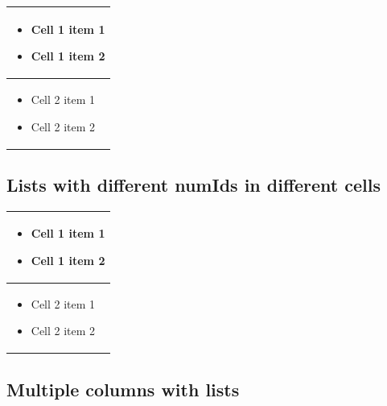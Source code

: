 \documentclass[11pt,a4paper]{article}
\begin{document}
\begin{table}[h]
\begin{tabular}{|l|}
\hline
\begin{itemize} \item Cell 1 item 1 \item Cell 1 item 2 \end{itemize} \\ \hline
\begin{itemize} \item Cell 2 item 1 \item Cell 2 item 2 \end{itemize} \\ \hline
\end{tabular}
\end{table}

\subsection{Lists with different numIds in different cells}

\begin{table}[h]
\begin{tabular}{|l|}
\hline
\begin{itemize} \item Cell 1 item 1 \item Cell 1 item 2 \end{itemize} \\ \hline
\begin{itemize} \item Cell 2 item 1 \item Cell 2 item 2 \end{itemize} \\ \hline
\end{tabular}
\end{table}

\subsection{Multiple columns with lists}
\end{document}
